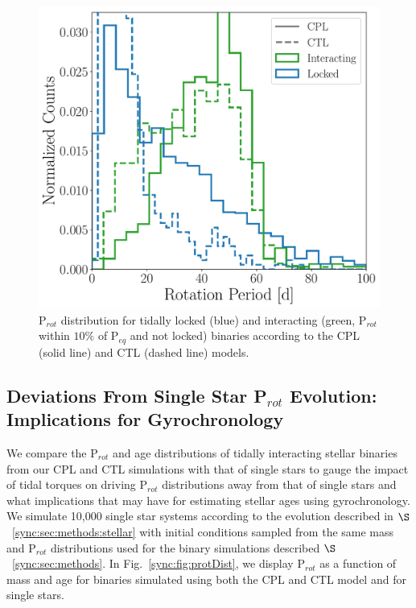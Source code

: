 \begin{figure}
	\includegraphics[width=\columnwidth]{lockedProtHist.pdf}
   \caption{P$_{rot}$ distribution for tidally locked (blue) and interacting (green, P$_{rot}$ within $10\%$ of P$_{eq}$ and not locked) binaries according to the CPL (solid line) and CTL (dashed line) models.}%
    \label{sync:fig:lockedProtHist}%
\end{figure}

\subsection{Deviations From Single Star P$_{rot}$ Evolution: Implications for Gyrochronology} \label{sync:sec:gyro}

We compare the P$_{rot}$ and age distributions of tidally interacting stellar binaries from our CPL and CTL simulations with that of single stars to gauge the impact of tidal torques on driving P$_{rot}$ distributions away from that of single stars and what implications that may have for estimating stellar ages using gyrochronology.  We simulate 10,000 single star systems according to the evolution described in $\S$~\ref{sync:sec:methods:stellar} with initial conditions sampled from the same mass and P$_{rot}$ distributions used for the binary simulations described $\S$~\ref{sync:sec:methods}. In Fig.~\ref{sync:fig:protDist}, we display P$_{rot}$ as a function of mass and age for binaries simulated using both the CPL and CTL model and for single stars.

